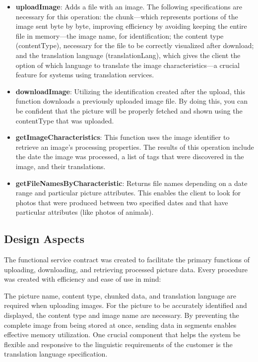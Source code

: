 \begin{itemize}
    \item \textbf{uploadImage}: Adds a file with an image. The following specifications are necessary for this operation: the chunk—which represents portions of the image sent byte by byte, improving efficiency by avoiding keeping the entire file in memory—the image name, for identification; the content type (contentType), necessary for the file to be correctly visualized after download; and the translation language (translationLang), which gives the client the option of which language to translate the image characteristics—a crucial feature for systems using translation services.
    \item \textbf{downloadImage}: Utilizing the identification created after the upload, this function downloads a previously uploaded image file. By doing this, you can be confident that the picture will be properly fetched and shown using the contentType that was uploaded.
    \item \textbf{getImageCharacteristics}: This function uses the image identifier to retrieve an image's processing properties. The results of this operation include the date the image was processed, a list of tags that were discovered in the image, and their translations.
    \item \textbf{getFileNamesByCharacteristic}: Returns file names depending on a date range and particular picture attributes. This enables the client to look for photos that were produced between two specified dates and that have particular attributes (like photos of animals).
\end{itemize}

\subsection{Design Aspects}\label{subsec:functional-operations-design-aspects}

The functional service contract was created to facilitate the primary functions of uploading, downloading, and retrieving processed picture data. Every procedure was created with efficiency and ease of use in mind:

The picture name, content type, chunked data, and translation language are required when uploading images. For the picture to be accurately identified and displayed, the content type and image name are necessary. By preventing the complete image from being stored at once, sending data in segments enables effective memory utilization. One crucial component that helps the system be flexible and responsive to the linguistic requirements of the customer is the translation language specification.

